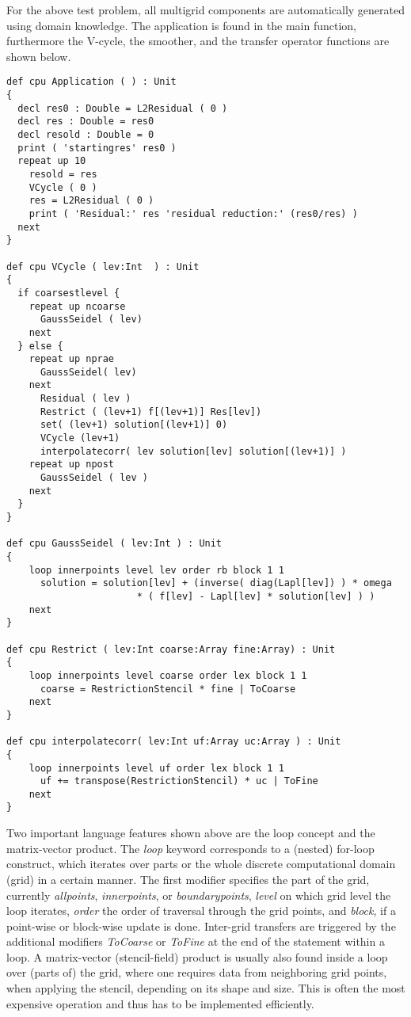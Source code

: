 \documentclass[onecolumn]{svjour3}
\begin{document}
For the above test problem, all multigrid components are automatically generated using domain knowledge. The application is found in the main function, furthermore the V-cycle, the smoother, and the transfer operator functions are shown below. 
\begin{verbatim}
def cpu Application ( ) : Unit 
{  
  decl res0 : Double = L2Residual ( 0 ) 
  decl res : Double = res0 
  decl resold : Double = 0 
  print ( 'startingres' res0 ) 
  repeat up 10 
    resold = res 
    VCycle ( 0 ) 
    res = L2Residual ( 0 ) 
    print ( 'Residual:' res 'residual reduction:' (res0/res) ) 
  next  
}  

def cpu VCycle ( lev:Int  ) : Unit 
{ 
  if coarsestlevel { 
    repeat up ncoarse 
      GaussSeidel ( lev) 
    next  
  } else { 
    repeat up nprae 
      GaussSeidel( lev) 
    next  
	  Residual ( lev ) 
	  Restrict ( (lev+1) f[(lev+1)] Res[lev]) 
	  set( (lev+1) solution[(lev+1)] 0) 
	  VCycle (lev+1) 
	  interpolatecorr( lev solution[lev] solution[(lev+1)] ) 
    repeat up npost 
      GaussSeidel ( lev ) 
    next  
  } 
} 

def cpu GaussSeidel ( lev:Int ) : Unit  
{ 
    loop innerpoints level lev order rb block 1 1 
      solution = solution[lev] + (inverse( diag(Lapl[lev]) ) * omega 
			           * ( f[lev] - Lapl[lev] * solution[lev] ) ) 
    next  
}  

def cpu Restrict ( lev:Int coarse:Array fine:Array) : Unit  
{ 
    loop innerpoints level coarse order lex block 1 1  
      coarse = RestrictionStencil * fine | ToCoarse  
    next  
}  

def cpu interpolatecorr( lev:Int uf:Array uc:Array ) : Unit 
{ 
    loop innerpoints level uf order lex block 1 1  
      uf += transpose(RestrictionStencil) * uc | ToFine  
    next  
}  
\end{verbatim}



Two important language features shown above are the loop concept and the matrix-vector product. The \textit{loop} keyword corresponds to a (nested) for-loop construct, which iterates over parts or the whole discrete computational domain (grid) in a certain manner. The first modifier specifies the part of the grid, currently \textit{allpoints}, \textit{innerpoints}, or \textit{boundarypoints}, \textit{level} on which grid level the loop iterates, \textit{order} the order of traversal through the grid points, and \textit{block}, if a point-wise or block-wise update is done. Inter-grid transfers are triggered by the additional modifiers \textit{ToCoarse} or \textit{ToFine} at the end of the statement within a loop. A matrix-vector (stencil-field) product is usually also found inside a loop over (parts of) the grid, where one requires data from neighboring grid points, when applying the stencil, depending on its shape and size. This is often the most expensive operation and thus has to be implemented efficiently. 
\end{document}
